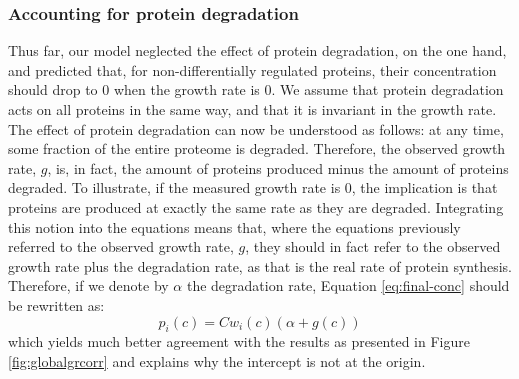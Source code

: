 \documentclass[notitlepage]{article}
\begin{document}
\subsubsection{Accounting for protein degradation}
Thus far, our model neglected the effect of protein degradation, on the one hand, and predicted that, for non-differentially regulated proteins, their concentration should drop to 0 when the growth rate is 0.
We assume that protein degradation acts on all proteins in the same way, and that it is invariant in the growth rate.
The effect of protein degradation can now be understood as follows: at any time, some fraction of the entire proteome is degraded.
Therefore, the observed growth rate, $g$, is, in fact, the amount of proteins produced minus the amount of proteins degraded.
To illustrate, if the measured growth rate is 0, the implication is that proteins are produced at exactly the same rate as they are degraded.
Integrating this notion into the equations means that, where the equations previously referred to the observed growth rate, $g$, they should in fact refer to the observed growth rate plus the degradation rate, as that is the real rate of protein synthesis.
Therefore, if we denote by $\alpha$ the degradation rate, Equation \ref{eq:final-conc} should be rewritten as:
\begin{equation}
  \label{eq:final-conc-deg}
  p_i(c)=Cw_i(c)(\alpha+g(c))
\end{equation}
which yields much better agreement with the results as presented in Figure \ref{fig:globalgrcorr} and explains why the intercept is not at the origin.
\end{document}

